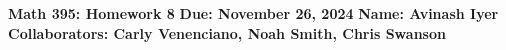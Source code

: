 \documentclass[10pt]{mypackage}
\begin{document}
\RaggedRight
\begin{center}
  \textbf{Math 395: Homework 8}\break
  \textbf{Due: November 26, 2024}\break
  \textbf{Name: Avinash Iyer}\break
  \textbf{Collaborators: Carly Venenciano, Noah Smith, Chris Swanson}
\end{center}
\end{document}
